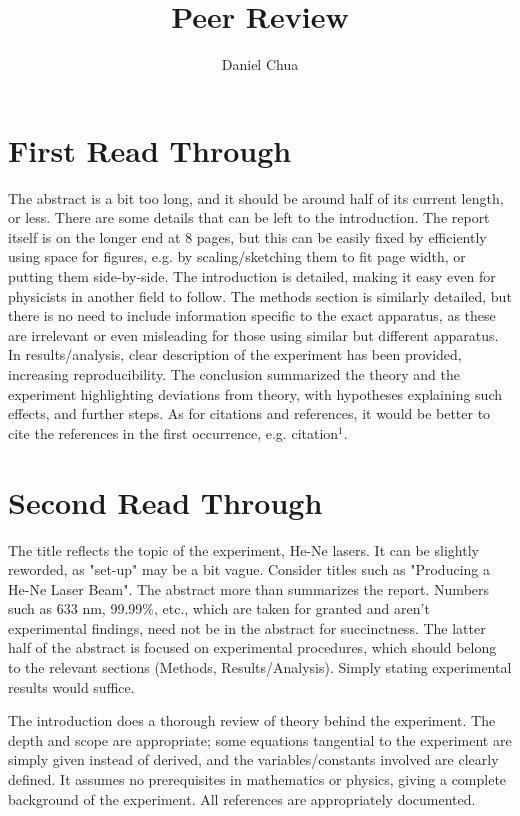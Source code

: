 \documentclass[12pt]{article}
\title{Peer Review}
\author{Daniel Chua}
\begin{document}
\maketitle

\section{First Read Through}

The abstract is a bit too long, and it should be around half of its current length, or less. There are some details that can be left to the introduction. The report itself is on the longer end at 8 pages, but this can be easily fixed by efficiently using space for figures, e.g. by scaling/sketching them to fit page width, or putting them side-by-side. The introduction is detailed, making it easy even for physicists in another field to follow. The methods section is similarly detailed, but there is no need to include information specific to the exact apparatus, as these are irrelevant or even misleading for those using similar but different apparatus. In results/analysis, clear description of the experiment has been provided, increasing reproducibility. The conclusion summarized the theory and the experiment highlighting deviations from theory, with hypotheses explaining such effects, and further steps. As for citations and references, it would be better to cite the references in the first occurrence, e.g. citation$^1$.

\section{Second Read Through}

The title reflects the topic of the experiment, He-Ne lasers. It can be slightly reworded, as "set-up" may be a bit vague. Consider titles such as "Producing a He-Ne Laser Beam". The abstract more than summarizes the report. Numbers such as 633 nm, 99.99\%, etc., which are taken for granted and aren't experimental findings, need not be in the abstract for succinctness. The latter half of the abstract is focused on experimental procedures, which should belong to the relevant sections (Methods, Results/Analysis). Simply stating experimental results would suffice.

The introduction does a thorough review of theory behind the experiment. The depth and scope are appropriate; some equations tangential to the experiment are simply given instead of derived, and the variables/constants involved are clearly defined. It assumes no prerequisites in mathematics or physics, giving a complete background of the experiment. All references are appropriately documented.
\end{document}
